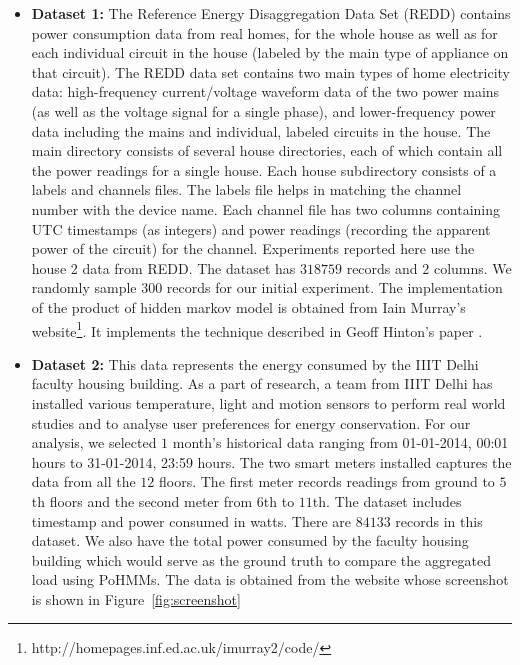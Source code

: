 \documentclass{sig-alternate}
\begin{document}
\begin{itemize}
\item \textbf{Dataset 1:} The Reference Energy Disaggregation Data Set (REDD) contains power consumption data from real homes, for the whole house as well as for each individual circuit in
the house (labeled by the main type of appliance on that circuit). %
The REDD data set contains two main types of home electricity data: high-frequency current/voltage waveform data of the two power mains (as well as the voltage signal for a single phase), and lower-frequency power data including the mains and individual, labeled circuits in the house. 
The main directory consists of several house directories, each of which contain all the power readings for a single house.  Each house subdirectory consists of a labels and channels files. The labels file helps in matching the channel number with the device name. Each channel file has two columns containing UTC timestamps (as integers) and power readings (recording the apparent power of the circuit) for the channel.
Experiments reported here use the house 2 data from REDD. The dataset has $318759$ records and $2$ columns. We randomly sample $300$ records for our initial experiment.
The implementation of the product of hidden markov model is obtained from Iain Murray's website\footnote{\label{link}http://homepages.inf.ed.ac.uk/imurray2/code/}. It implements the technique described in Geoff Hinton's paper \cite{hinton2000}.


\item \textbf{Dataset 2:} This data represents the energy consumed by the IIIT Delhi faculty housing building. As a part of research, a team from IIIT Delhi has installed various temperature, light and motion sensors to perform real world studies and to analyse user preferences for energy conservation. For our analysis, we selected $1$ month's historical data ranging from 01-01-2014, 00:01 hours to 31-01-2014, 23:59 hours. The two smart meters installed captures the data from all the $12$ floors. The first meter records readings from ground to $5$th floors and the second meter from $6$th to $11$th. The dataset includes timestamp and power consumed in watts. There are $84133$ records in this dataset. We also have the total power consumed by the faculty housing building which would serve as the ground truth to compare the aggregated load using PoHMMs. The data is obtained from the website whose screenshot is shown in Figure~\ref{fig:screenshot}



\end{itemize}
\end{document}
